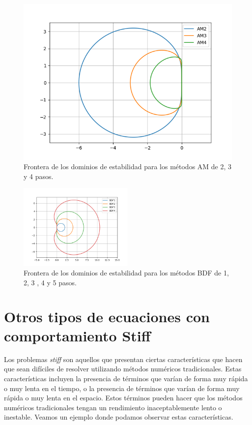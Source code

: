 \begin{figure}[H]
    \centering
    \includegraphics[width=0.5\linewidth]{imagenes/AM.png}
    \caption*{Frontera de los dominios de estabilidad para los métodos AM de 2, 3 y 4 pasos.}
\end{figure}

\begin{figure}[H]
    \centering
    \includegraphics[width=0.5\textwidth]{imagenes/BDF.png}
    \caption*{Frontera de los dominios de estabilidad para los métodos BDF de 1, 2, 3 , 4 y 5 pasos.}
\end{figure}

\section{Otros tipos de ecuaciones con comportamiento Stiff}
\noindent Los problemas \textit{stiff} son aquellos que presentan ciertas características que hacen que sean difíciles de resolver utilizando métodos numéricos tradicionales. Estas características incluyen la presencia de términos que varían de forma muy rápida o muy lenta en el tiempo, o la presencia de términos que varían de forma muy rápida o muy lenta en el espacio. Estos términos pueden hacer que los métodos numéricos tradicionales tengan un rendimiento inaceptablemente lento o inestable. Veamos un ejemplo donde podamos observar estas características.

